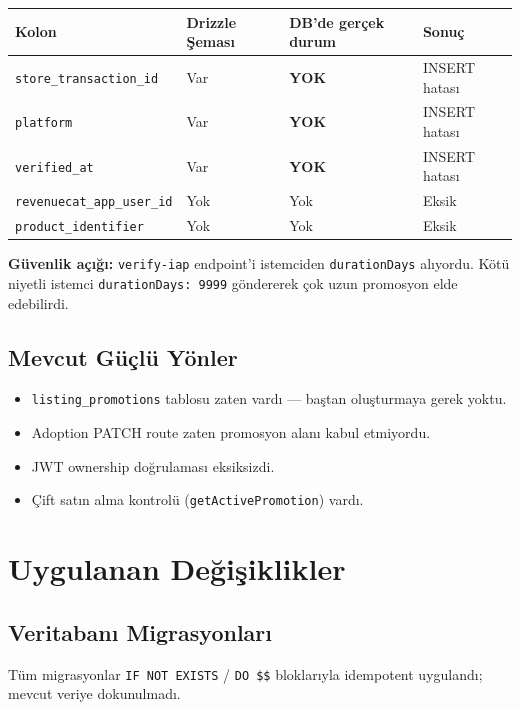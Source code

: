\documentclass[12pt,a4paper]{article}
\begin{document}
\begin{center}
\begin{tabular}{llll}
  \toprule
  \textbf{Kolon} & \textbf{Drizzle Şeması} & \textbf{DB'de gerçek durum} & \textbf{Sonuç}\\
  \midrule
  \texttt{store\_transaction\_id} & Var & \textbf{YOK} & INSERT hatası\\
  \texttt{platform}               & Var & \textbf{YOK} & INSERT hatası\\
  \texttt{verified\_at}           & Var & \textbf{YOK} & INSERT hatası\\
  \texttt{revenuecat\_app\_user\_id} & Yok & Yok       & Eksik\\
  \texttt{product\_identifier}    & Yok & Yok          & Eksik\\
  \bottomrule
\end{tabular}
\end{center}

\medskip
\noindent\textbf{Güvenlik açığı:} \texttt{verify-iap} endpoint'i istemciden
\texttt{durationDays} alıyordu. Kötü niyetli istemci
\texttt{durationDays: 9999} göndererek çok uzun promosyon elde edebilirdi.

\subsection{Mevcut Güçlü Yönler}

\begin{itemize}[leftmargin=1.5em]
  \item \texttt{listing\_promotions} tablosu zaten vardı — baştan oluşturmaya gerek yoktu.
  \item Adoption PATCH route zaten promosyon alanı kabul etmiyordu.
  \item JWT ownership doğrulaması eksiksizdi.
  \item Çift satın alma kontrolü (\texttt{getActivePromotion}) vardı.
\end{itemize}

\section{Uygulanan Değişiklikler}

\subsection{Veritabanı Migrasyonları}

Tüm migrasyonlar \texttt{IF NOT EXISTS} / \texttt{DO \$\$} bloklarıyla
idempotent uygulandı; mevcut veriye dokunulmadı.
\end{document}
